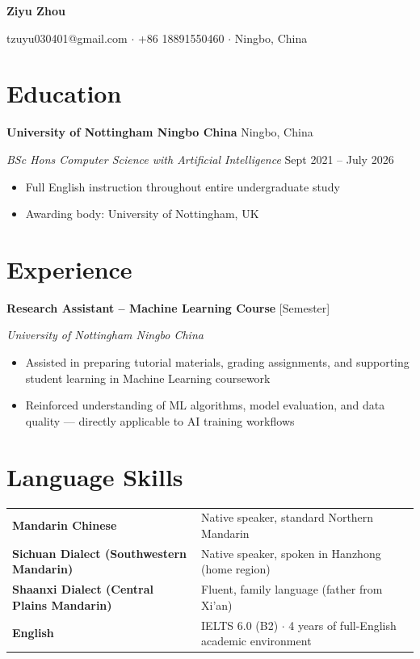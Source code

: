 \documentclass[11pt,a4paper]{article}
\begin{document}
\begin{center}
{\LARGE\bfseries Ziyu Zhou}
\vspace{4pt}

\small
tzuyu030401@gmail.com $\cdot$ +86 18891550460 $\cdot$ Ningbo, China
\end{center}

\section{Education}

\textbf{University of Nottingham Ningbo China} \hfill Ningbo, China
\par
\textit{BSc Hons Computer Science with Artificial Intelligence} \hfill Sept 2021 -- July 2026
\begin{itemize}
  \item Full English instruction throughout entire undergraduate study
  \item Awarding body: University of Nottingham, UK
\end{itemize}

\section{Experience}

\textbf{Research Assistant -- Machine Learning Course} \hfill [Semester]
\par\textit{University of Nottingham Ningbo China}
\begin{itemize}
  \item Assisted in preparing tutorial materials, grading assignments, and supporting student learning in Machine Learning coursework
  \item Reinforced understanding of ML algorithms, model evaluation, and data quality --- directly applicable to AI training workflows
\end{itemize}

\section{Language Skills}

\begin{tabular}{l l}
\textbf{Mandarin Chinese} & Native speaker, standard Northern Mandarin \\
\textbf{Sichuan Dialect (Southwestern Mandarin)} & Native speaker, spoken in Hanzhong (home region) \\
\textbf{Shaanxi Dialect (Central Plains Mandarin)} & Fluent, family language (father from Xi'an) \\
\textbf{English} & IELTS 6.0 (B2) $\cdot$ 4 years of full-English academic environment \\
\end{tabular}
\end{document}
